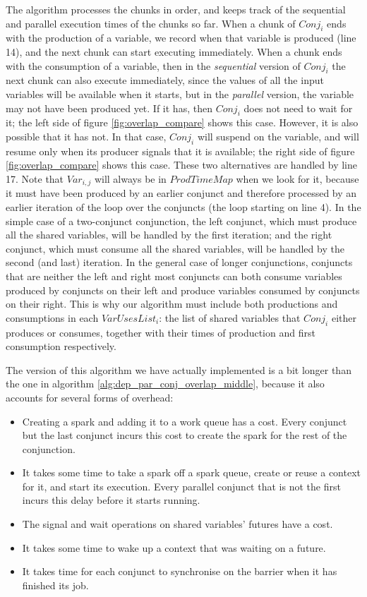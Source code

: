 The algorithm processes the chunks in order, and keeps track
of the sequential and parallel execution times of the chunks so far.
When a chunk of $Conj_i$ ends with the production of a variable,
we record when that variable is produced (line 14),
and the next chunk can start executing immediately.
When a chunk ends with the consumption of a variable,
then in the \emph{sequential} version of $Conj_i$
the next chunk can also execute immediately,
since the values of all the input variables will be available when it starts,
but in the \emph{parallel} version,
the variable may not have been produced yet.
If it has, then $Conj_i$ does not need to wait for it;
the left side of figure \ref{fig:overlap_compare} shows this case.
However, it is also possible that it has not.
In that case, $Conj_i$ will suspend on the variable,
and will resume only when its producer signals that it is available;
the right side of figure \ref{fig:overlap_compare} shows this case.
These two alternatives are handled by line 17.
Note that $Var_{i, j}$
will always be in $ProdTimeMap$ when we look for it,
because it must have been produced by an earlier conjunct
and therefore processed by an earlier iteration of the loop over the
conjuncts (the loop starting on line 4).
In the simple case of a two-conjunct conjunction,
the left conjunct,
which must produce all the shared variables,
will be handled by the first iteration;
and the right conjunct,
which must consume all the shared variables,
will be handled by the second (and last) iteration.
In the general case of longer conjunctions,
conjuncts that are neither the left and right most conjuncts
can both consume variables produced by conjuncts on their left
and produce variables consumed by conjuncts on their right.
This is why our algorithm must include both productions and consumptions
in each $VarUsesList_i$:
the list of shared variables that $Conj_i$ either produces or consumes,
together with their times of production and first consumption respectively.

The version of this algorithm we have actually implemented is
a bit longer than the one in algorithm \ref{alg:dep_par_conj_overlap_middle},
because it also accounts for several forms of overhead:

\begin{itemize}
\item
Creating a spark and adding it to a work queue has a cost.
Every conjunct but the last conjunct incurs this cost
to create the spark for the rest of the conjunction.
\item
It takes some time to take a spark off a spark queue,
create or reuse a context for it, and start its execution.
Every parallel conjunct that is not the first incurs this delay
before it starts running.
\item
The signal and wait operations on shared variables' futures have a cost.
\item
It takes some time to wake up a context that was waiting on a future.
\item
It takes time for each conjunct to synchronise on the barrier
when it has finished its job.
\end{itemize}

